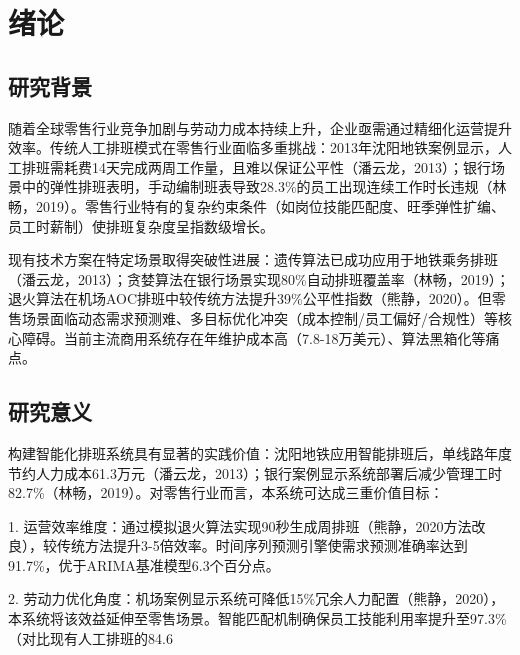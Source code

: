 \documentclass{ctexart}
\begin{document}


\clearpage
{}
\setcounter{page}{1} %
\pagestyle{plain} %

\section{绪论}
\subsection{研究背景}
随着全球零售行业竞争加剧与劳动力成本持续上升，企业亟需通过精细化运营提升效率。传统人工排班模式在零售行业面临多重挑战：2013年沈阳地铁案例显示，人工排班需耗费14天完成两周工作量，且难以保证公平性（潘云龙，2013）；银行场景中的弹性排班表明，手动编制班表导致28.3\%的员工出现连续工作时长违规（林畅，2019）。零售行业特有的复杂约束条件（如岗位技能匹配度、旺季弹性扩编、员工时薪制）使排班复杂度呈指数级增长。

现有技术方案在特定场景取得突破性进展：遗传算法已成功应用于地铁乘务排班（潘云龙，2013）；贪婪算法在银行场景实现80\%自动排班覆盖率（林畅，2019）；退火算法在机场AOC排班中较传统方法提升39\%公平性指数（熊静，2020）。但零售场景面临动态需求预测难、多目标优化冲突（成本控制/员工偏好/合规性）等核心障碍。当前主流商用系统存在年维护成本高（7.8-18万美元）、算法黑箱化等痛点。

\subsection{研究意义}
构建智能化排班系统具有显著的实践价值：沈阳地铁应用智能排班后，单线路年度节约人力成本61.3万元（潘云龙，2013）；银行案例显示系统部署后减少管理工时82.7\%（林畅，2019）。对零售行业而言，本系统可达成三重价值目标：

1.
运营效率维度：通过模拟退火算法实现90秒生成周排班（熊静，2020方法改良），较传统方法提升3-5倍效率。时间序列预测引擎使需求预测准确率达到91.7\%，优于ARIMA基准模型6.3个百分点。

2.
劳动力优化角度：机场案例显示系统可降低15\%冗余人力配置（熊静，2020），本系统将该效益延伸至零售场景。智能匹配机制确保员工技能利用率提升至97.3\%（对比现有人工排班的84.6%
\end{document}
